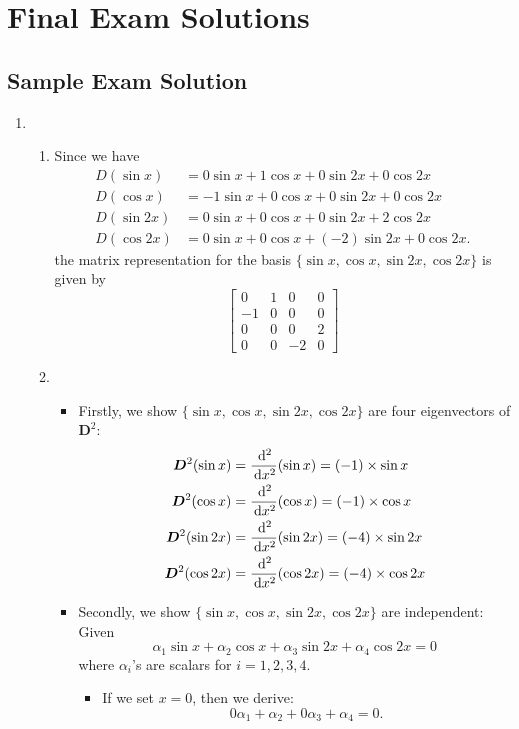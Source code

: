 \section{Final Exam Solutions}
\subsection{Sample Exam Solution}
\begin{enumerate}
\item
\begin{enumerate}
\item
Since we have
\begin{align*}
D(\sin x)&=0\sin x+1\cos x+0\sin 2x+0\cos 2x\\
D(\cos x)&=-1\sin x+0\cos x+0\sin 2x+0\cos 2x\\
D(\sin 2x)&=0\sin x+0\cos x+0\sin 2x+2\cos 2x\\
D(\cos 2x)&=0\sin x+0\cos x+(-2)\sin 2x+0\cos 2x.
\end{align*}
the matrix representation for the basis $\{\sin x,\cos x,\sin 2x,\cos 2x\}$ is given by
\[
\begin{bmatrix}
0&1&0&0\\-1&0&0&0\\0&0&0&2\\0&0&-2&0
\end{bmatrix}
\]
\item
\begin{itemize}
\item
Firstly, we show $\{\sin x,\cos x,\sin 2x,\cos 2x\}$ are four eigenvectors of $\bm D^2$:
\begin{align*}
\bm D^2(\sin x)&=\frac{\,\mathrm{d}^2}{\,\mathrm{d} x^2}(\sin x)=(-1)\times\sin x\\
\bm D^2(\cos x)&=\frac{\,\mathrm{d}^2}{\,\mathrm{d} x^2}(\cos x)=(-1)\times\cos x\\
\bm D^2(\sin 2x)&=\frac{\,\mathrm{d}^2}{\,\mathrm{d} x^2}(\sin 2x)=(-4)\times\sin 2x\\
\bm D^2(\cos 2x)&=\frac{\,\mathrm{d}^2}{\,\mathrm{d} x^2}(\cos 2x)=(-4)\times\cos 2x
\end{align*}
\item
Secondly, we show $\{\sin x,\cos x,\sin 2x,\cos 2x\}$ are independent:\\
Given 
\[
\alpha_1\sin x+\alpha_2\cos x+\alpha_3\sin 2x+\alpha_4\cos 2x=0
\]
where $\alpha_i$'s are scalars for $i=1,2,3,4$.
\begin{itemize}
\item
If we set $x=0$, then we derive:
\[
0\alpha_1+\alpha_2+0\alpha_3+\alpha_4=0.
\]
\end{itemize}
\end{itemize}
\end{enumerate}
\end{enumerate}

